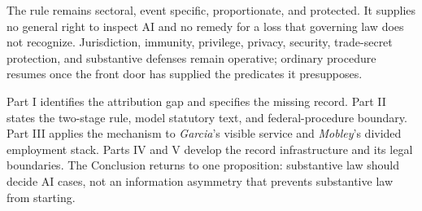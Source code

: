 The rule remains sectoral, event specific, proportionate, and protected. It supplies no general right to inspect AI and no remedy for a loss that governing law does not recognize. Jurisdiction, immunity, privilege, privacy, security, trade-secret protection, and substantive defenses remain operative; ordinary procedure resumes once the front door has supplied the predicates it presupposes.

Part I identifies the attribution gap and specifies the missing record. Part II states the two-stage rule, model statutory text, and federal-procedure boundary. Part III applies the mechanism to \emph{Garcia}'s visible service and \emph{Mobley}'s divided employment stack. Parts IV and V develop the record infrastructure and its legal boundaries. The Conclusion returns to one proposition: substantive law should decide AI cases, not an information asymmetry that prevents substantive law from starting.

\clearpage
